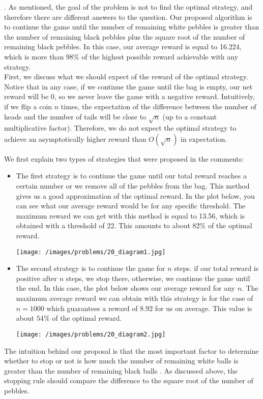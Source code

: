 \begin{solution}.
As mentioned, the goal of the problem is not to find the optimal strategy, and therefore there are different answers to the question. Our proposed algorithm is to continue the game until the number of remaining white pebbles is greater than the number of remaining black pebbles plus the square root of the number of remaining black pebbles. In this case, our average reward is equal to 16.224, which is more than $98\%$ of the highest possible reward achievable with any strategy.\\[0.2cm]

First, we discuss what we should expect of the reward of the optimal strategy. Notice that in any case, if we continue the game until the bag is empty, our net reward will be 0, so we never leave the game with a negative reward. Intuitively, if we flip a coin $n$ times, the expectation of the difference between the number of heads and the number of tails will be close to $\sqrt{n}$ (up to a constant multiplicative factor). Therefore, we do not expect the optimal strategy to  achieve an asymptotically higher reward than $O(\sqrt{n})$ in expectation. 


We first explain two types of strategies that were proposed in the comments:

\begin{itemize}
\item The first strategy is to continue the game until our total reward reaches a certain number or we remove all of the pebbles from the bag. This method gives us a good approximation of the optimal reward. In the plot below, you can see what our average reward would be for any specific threshold. The maximum reward we can get with this method is equal to 13.56, which is obtained with a threshold of 22. This amounts to about $82\%$ of the optimal reward.

\begin{center}
	\texttt{[image: /images/problems/20\_diagram1.jpg]}
\end{center}

\item The second strategy is to continue the game for $n$ steps. if our total reward is positive after $n$ steps, we stop there, otherwise, we continue the game until the end. In this case, the plot below shows our average reward for any $n$. The maximum average reward we can obtain with this strategy is for the case of $n=1000$ which guarantees a reward of $8.92$ for us on average. This value is about $54\%$ of the optimal reward.

\begin{center}
	\texttt{[image: /images/problems/20\_diagram2.jpg]}
\end{center}
\end{itemize}


The intuition behind our proposal is that the most important factor to determine whether to stop or not is how much the number of remaining white balls  is greater than the number of remaining black balls . As discussed above, the stopping rule should compare the difference to the square root of the number of pebbles.
\end{solution}
